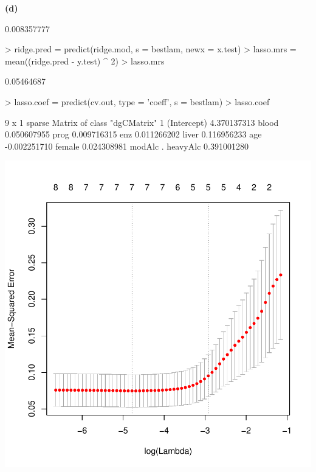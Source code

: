 \documentclass[a4paper]{article}
\renewcommand{\part}[1] {\vspace{.10in} {\bf (#1)}}
\begin{document}
\part{d}
\begin{Schunk}
\begin{Soutput}
[1] 0.008357777
\end{Soutput}
\begin{Sinput}
> ridge.pred = predict(ridge.mod, s = bestlam, newx = x.test)
> lasso.mrs = mean((ridge.pred - y.test) ^ 2)
> lasso.mrs
\end{Sinput}
\begin{Soutput}
[1] 0.05464687
\end{Soutput}
\begin{Sinput}
> lasso.coef = predict(cv.out, type = 'coeff', s = bestlam)
> lasso.coef
\end{Sinput}
\begin{Soutput}
9 x 1 sparse Matrix of class "dgCMatrix"
                       1
(Intercept)  4.370137313
blood        0.050607955
prog         0.009716315
enz          0.011266202
liver        0.116956233
age         -0.002251710
female       0.024308981
modAlc       .          
heavyAlc     0.391001280
\end{Soutput}
\end{Schunk}
\includegraphics{crossvalidation-99d}
\end{document}
